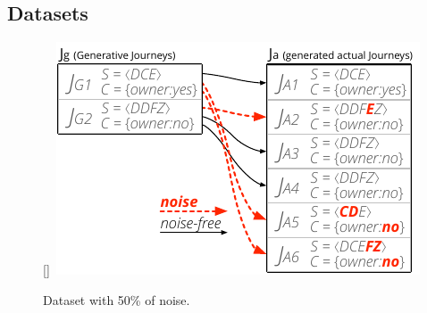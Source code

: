 \documentclass[runningheads]{llncs}
\begin{document}
\subsection{Datasets}


\begin{figure}
  \begin{center}
    \raisebox{0pt}[\dimexpr{}\baselineskip\relax]{\
\includegraphics[width=0.42\columnwidth]{05_schema/dataset.pdf}
    }
  \end{center}
  \vspace{-5pt}
  \caption{Dataset with 50\% of noise.}
  \label{fig:dataset}
\end{figure} 
\end{document}
